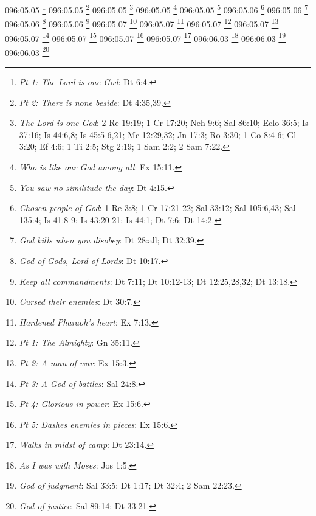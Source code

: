 096:05.05 \footnote{\textit{Pt 1: The Lord is one God}: Dt 6:4.}
096:05.05 \footnote{\textit{Pt 2: There is none beside}: Dt 4:35,39.}
096:05.05 \footnote{\textit{The Lord is one God}: 2 Re 19:19; 1 Cr 17:20; Neh 9:6; Sal 86:10; Eclo 36:5; Is 37:16; Is 44:6,8; Is 45:5-6,21; Mc 12:29,32; Jn 17:3; Ro 3:30; 1 Co 8:4-6; Gl 3:20; Ef 4:6; 1 Ti 2:5; Stg 2:19; 1 Sam 2:2; 2 Sam 7:22.}
096:05.05 \footnote{\textit{Who is like our God among all}: Ex 15:11.}
096:05.05 \footnote{\textit{You saw no similitude the day}: Dt 4:15.}
096:05.06 \footnote{\textit{Chosen people of God}: 1 Re 3:8; 1 Cr 17:21-22; Sal 33:12; Sal 105:6,43; Sal 135:4; Is 41:8-9; Is 43:20-21; Is 44:1; Dt 7:6; Dt 14:2.}
096:05.06 \footnote{\textit{God kills when you disobey}: Dt 28:all; Dt 32:39.}
096:05.06 \footnote{\textit{God of Gods, Lord of Lords}: Dt 10:17.}
096:05.06 \footnote{\textit{Keep all commandments}: Dt 7:11; Dt 10:12-13; Dt 12:25,28,32; Dt 13:18.}
096:05.07 \footnote{\textit{Cursed their enemies}: Dt 30:7.}
096:05.07 \footnote{\textit{Hardened Pharaoh's heart}: Ex 7:13.}
096:05.07 \footnote{\textit{Pt 1: The Almighty}: Gn 35:11.}
096:05.07 \footnote{\textit{Pt 2: A man of war}: Ex 15:3.}
096:05.07 \footnote{\textit{Pt 3: A God of battles}: Sal 24:8.}
096:05.07 \footnote{\textit{Pt 4: Glorious in power}: Ex 15:6.}
096:05.07 \footnote{\textit{Pt 5: Dashes enemies in pieces}: Ex 15:6.}
096:05.07 \footnote{\textit{Walks in midst of camp}: Dt 23:14.}
096:06.03 \footnote{\textit{As I was with Moses}: Jos 1:5.}
096:06.03 \footnote{\textit{God of judgment}: Sal 33:5; Dt 1:17; Dt 32:4; 2 Sam 22:23.}
096:06.03 \footnote{\textit{God of justice}: Sal 89:14; Dt 33:21.}
